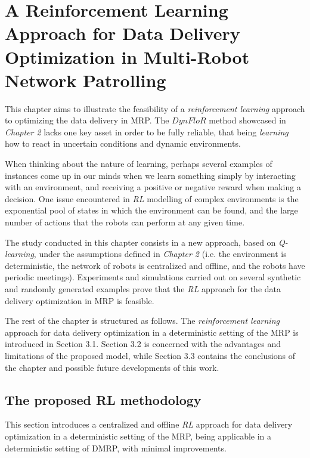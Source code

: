 \chapter[A RL Approach for Data Delivery Optimization]{A Reinforcement Learning Approach for Data Delivery Optimization in Multi-Robot Network Patrolling}
\label{rl}
This chapter aims to illustrate the feasibility of a \emph{reinforcement learning} approach to optimizing the data delivery in MRP. The $\mathit{DynFloR}$ method showcased in \emph{Chapter 2} lacks one key asset in order to be fully reliable, that being \emph{learning} how to react in uncertain conditions and dynamic environments.

When thinking about the nature of learning, perhaps several examples of instances come up in our minds when we learn something simply by interacting with an environment, and receiving a positive or negative reward when making a decision. One issue encountered in \emph{RL} modelling of complex environments is the exponential pool of states in which the environment can be found, and the large number of actions that the robots can perform at any given time.

\par The study conducted in this chapter consists in a new approach, based on \emph{Q-learning}, under the assumptions defined in \emph{Chapter 2} (i.e. the environment is deterministic, the network of robots is centralized and offline, and the robots have periodic meetings). Experiments and simulations carried out on several synthetic and randomly generated examples prove that the \emph{RL} approach for the data delivery optimization in MRP is feasible.

\par The rest of the chapter is structured as follows. The \emph{reinforcement learning} approach for data delivery optimization in a deterministic setting of the MRP is introduced in Section 3.1. Section 3.2 is concerned with the advantages and limitations of the proposed model, while Section 3.3 contains the conclusions of the chapter and possible future developments of this work.
\pagebreak

\section{The proposed RL methodology}

This section introduces a centralized and offline \emph{RL} approach for data delivery optimization in a deterministic setting of the MRP, being applicable in a deterministic setting of DMRP, with minimal improvements.


